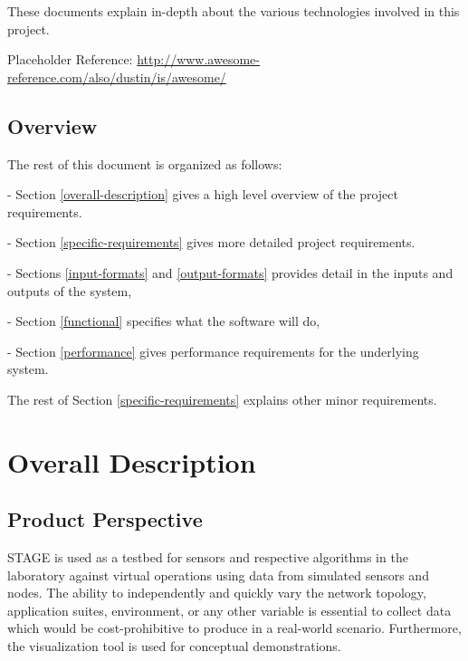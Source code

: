 \documentclass[titlepage]{article}
\begin{document}
These documents explain in-depth about the various technologies involved in this project.
%
\begin{itemize*}
	\item Placeholder Reference: \url{http://www.awesome-reference.com/also/dustin/is/awesome/}
\end{itemize*}


\subsection{Overview%
  \label{overview}%
}

The rest of this document is organized as follows: 
\begin{itemize*}
	\item[-]Section \ref{overall-description} gives a high level overview of the project requirements.  
	\item[-]Section \ref{specific-requirements} gives more detailed project requirements.  
	\item[-]Sections \ref{input-formats} and \ref{output-formats} provides detail in the inputs and outputs of the system, 
	\item[-]Section \ref{functional} specifies what the software will do, 
	\item[-]Section \ref{performance} gives performance requirements for the underlying system.
\end{itemize*}
The rest of Section \ref{specific-requirements} explains other minor requirements.



\section{Overall Description%
  \label{overall-description}%
}


\subsection{Product Perspective%
  \label{product-perspective}%
}

STAGE is used as a testbed for sensors and respective algorithms in the laboratory against virtual operations using data from simulated sensors and nodes. The ability to independently and quickly vary the network topology, application suites, environment, or any other variable is essential to collect data which would be cost-prohibitive to produce in a real-world scenario. Furthermore, the visualization tool is used for conceptual demonstrations.
\end{document}
